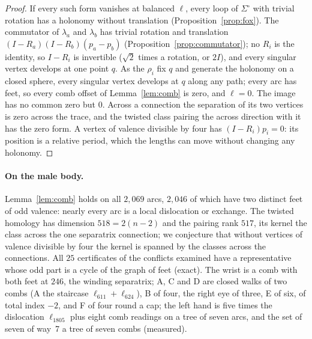\documentclass[11pt,a4paper]{article}
\begin{document}
\begin{proof}
If every such form vanishes at balanced $\ell$, every loop of $\Sigma^\circ$
with trivial rotation has a holonomy without translation
(Proposition~\ref{prop:fox}). The commutator of $\lambda_a$ and $\lambda_b$
has trivial rotation and translation $(I - R_a)(I - R_b)(p_a - p_b)$
(Proposition~\ref{prop:commutator}); no $R_i$ is the identity, so $I - R_i$ is
invertible ($\sqrt2$ times a rotation, or $2I$), and every singular vertex
develops at one point $q$. As the $\rho_i$ fix $q$ and generate the holonomy on a closed
sphere, every singular vertex develops at $q$ along any path; every arc has
feet, so every comb offset of Lemma~\ref{lem:comb} is zero, and $\ell = 0$.
The image has no common zero but $0$. Across a connection the
separation of its two vertices is zero across the trace, and the twisted class
pairing the across direction with it has the zero form. A vertex of valence
divisible by four has $(I - R_i)p_i = 0$: its position is a relative period,
which the lengths can move without changing any holonomy.
\end{proof}

\paragraph{On the male body.}
Lemma~\ref{lem:comb} holds on all $2{,}069$ arcs, $2{,}046$ of which have two
distinct feet of odd valence: nearly every arc is a local dislocation or
exchange. The
twisted homology has dimension $518 = 2(n - 2)$ and the pairing rank $517$,
its kernel the class across the one separatrix connection; we conjecture that
without vertices of valence divisible by four the kernel is spanned by the
classes across the connections. All $25$ certificates of the conflicts
examined have a representative whose odd part is a cycle of the graph of feet
(exact). The wrist is a comb with both feet at $246$, the winding separatrix;
A, C and D are closed walks of two combs (A the staircase $\ell_{611} +
\ell_{624}$), B of four, the right eye of three, E of six, of total index
$-2$, and F of four round a cap; the left hand is five times the dislocation
$\ell_{1805}$ plus eight comb readings on a tree of seven arcs, and the set of
seven of way~7 a tree of seven combs (measured).
\end{document}
